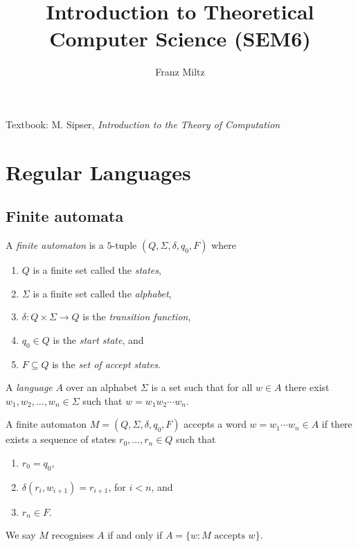 \documentclass{article}
\title{Introduction to Theoretical Computer Science (SEM6)}
\author{Franz Miltz}
\begin{document}
\maketitle
\noindent Textbook: M. Sipser, \emph{Introduction to the Theory of Computation}
\tableofcontents
\pagebreak

\section{Regular Languages}

\subsection{Finite automata}

\begin{definition}[Sipser, p. 35]
    A \emph{finite automaton} is a $5$-tuple $(Q,\Sigma,\delta,q_0,F)$ where 
    \begin{enumerate}
        \item $Q$ is a finite set called the \emph{states},
        \item $\Sigma$ is a finite set called the \emph{alphabet},
        \item $\delta:Q\times\Sigma\to Q$ is the \emph{transition function},
        \item $q_0\in Q$ is the \emph{start state}, and 
        \item $F\subseteq Q$ is the \emph{set of accept states}.
    \end{enumerate} 
\end{definition}

\begin{definition}
    A \emph{language} $A$ over an alphabet $\Sigma$ is a set such that for all 
    $w\in A$ there exist $w_1,w_2,...,w_n\in\Sigma$ such that $w=w_1w_2\cdots w_n$.
    
    A finite automaton $M=(Q,\Sigma,\delta,q_0,F)$ accepts a word $w=w_1\cdots w_n\in A$ 
    if there exists a sequence of states $r_0,...,r_n\in Q$ such that 
    \begin{enumerate}
        \item $r_0=q_0$,
        \item $\delta(r_i,w_{i+1})=r_{i+1}$, for $i<n$, and 
        \item $r_n\in F$.
    \end{enumerate}
    We say $M$ recognises $A$ if and only if $A=\{w : M\text{ accepts }w\}$.
\end{definition}
\end{document}
